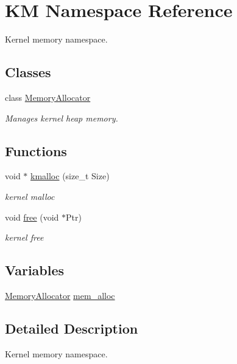 \hypertarget{namespace_k_m}{}\section{KM Namespace Reference}
\label{namespace_k_m}


Kernel memory namespace.  


\subsection*{Classes}
\begin{DoxyCompactItemize}
\item 
class \hyperlink{class_k_m_1_1_memory_allocator}{Memory\+Allocator}
\begin{DoxyCompactList}\small\item\em Manages kernel heap memory. \end{DoxyCompactList}\end{DoxyCompactItemize}
\subsection*{Functions}
\begin{DoxyCompactItemize}
\item 
void $\ast$ \hyperlink{namespace_k_m_aaeb8403b430af6311bb3c1df6ae520b6}{kmalloc} (size\+\_\+t Size)
\begin{DoxyCompactList}\small\item\em kernel malloc \end{DoxyCompactList}\item 
void \hyperlink{namespace_k_m_a08363437a217255f3f9d2a393a54714b}{free} (void $\ast$Ptr)
\begin{DoxyCompactList}\small\item\em kernel free \end{DoxyCompactList}\end{DoxyCompactItemize}
\subsection*{Variables}
\begin{DoxyCompactItemize}
\item 
\hyperlink{class_k_m_1_1_memory_allocator}{Memory\+Allocator} \hyperlink{namespace_k_m_ab71afb37d9950edf604f583b657905aa}{mem\+\_\+alloc}
\end{DoxyCompactItemize}


\subsection{Detailed Description}
Kernel memory namespace. 


